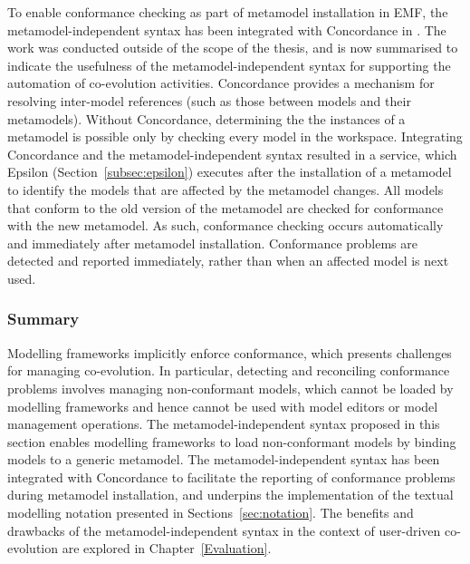 
To enable conformance checking as part of metamodel installation in EMF, the metamodel-independent syntax has been integrated with Concordance in \cite{rose10concordance}. The work was conducted outside of the scope of the thesis, and is now summarised to indicate the usefulness of the metamodel-independent syntax for supporting the automation of co-evolution activities. Concordance provides a mechanism for resolving inter-model references (such as those between models and their metamodels). Without Concordance, determining the the instances of a metamodel is possible only by checking every model in the workspace. Integrating Concordance and the metamodel-independent syntax resulted in a service, which Epsilon (Section~\ref{subsec:epsilon}) executes after the installation of a metamodel to identify the models that are affected by the metamodel changes. All models that conform to the old version of the metamodel are checked for conformance with the new metamodel. As such, conformance checking occurs automatically and immediately after metamodel installation. Conformance problems are detected and reported immediately, rather than when an affected model is next used.

\subsubsection{Summary}
Modelling frameworks implicitly enforce conformance, which presents challenges for managing co-evolution. In particular, detecting and reconciling conformance problems involves managing non-conformant models, which cannot be loaded by modelling frameworks and hence cannot be used with model editors or model management operations. The metamodel-independent syntax proposed in this section enables modelling frameworks to load non-conformant models by binding models to a generic metamodel. The metamodel-independent syntax has been integrated with Concordance \cite{rose10concordance} to facilitate the reporting of conformance problems during metamodel installation, and underpins the implementation of the textual modelling notation presented in Sections~\ref{sec:notation}. The benefits and drawbacks of the metamodel-independent syntax in the context of user-driven co-evolution are explored in Chapter~\ref{Evaluation}. 
